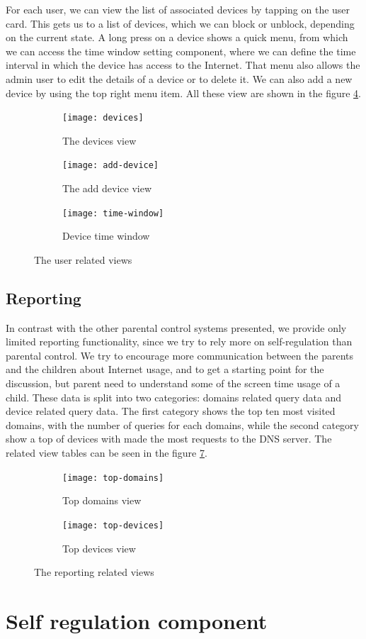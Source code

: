 For each user, we can view the list of associated devices by tapping on the user card. This gets us to a list of devices, which we can block or unblock, depending on the current state. A long press on a device shows a quick menu, from which we can access the time window setting component, where we can define the time interval in which the device has access to the Internet. That menu also allows the admin user to edit the details of a device or to delete it. We can also add a new device by using the top right menu item. All these view are shown in the figure \ref{fig:device-views}.

\begin{figure}
\centering
\begin{subfigure}{.33\textwidth}
  \centering
  \texttt{[image: devices]}
  \caption{The devices view}
  \label{fig:devices}
\end{subfigure}%
\begin{subfigure}{.33\textwidth}
  \centering
  \texttt{[image: add-device]}
  \caption{The add device view}
  \label{fig:add-device}
\end{subfigure}
\begin{subfigure}{.33\textwidth}
  \centering
  \texttt{[image: time-window]}
  \caption{Device time window}
  \label{fig:time-window}
\end{subfigure}
\caption{The user related views}
\label{fig:device-views}
\end{figure}

\subsection{Reporting}

In contrast with the other parental control systems presented, we provide only limited reporting functionality, since we try to rely more on self-regulation than parental control. We try to encourage more communication between the parents and the children about Internet usage, and to get a starting point for the discussion, but parent need to understand some of the screen time usage of a child. These data is split into two categories: domains related query data and device related query data. The first category shows the top ten most visited domains, with the number of queries for each domains, while the second category show a top of devices with made the most requests to the DNS server. The related view tables can be seen in the figure \ref{fig:top-views}.

\begin{figure}
\centering
\begin{subfigure}{.5\textwidth}
  \centering
  \texttt{[image: top-domains]}
  \caption{Top domains view}
  \label{fig:top-domains}
\end{subfigure}%
\begin{subfigure}{.5\textwidth}
  \centering
  \texttt{[image: top-devices]}
  \caption{Top devices view}
  \label{fig:top-devices}
\end{subfigure}
\caption{The reporting related views}
\label{fig:top-views}
\end{figure}

\section{Self regulation component}

